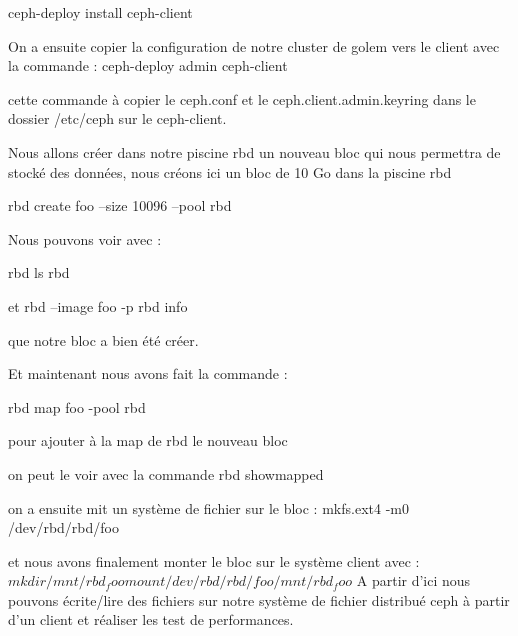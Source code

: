 \documentclass{article}
\begin{document}
ceph-deploy install ceph-client

On a ensuite copier la configuration de notre cluster de golem vers le client avec la commande : 
ceph-deploy admin ceph-client

cette commande à copier le ceph.conf et le ceph.client.admin.keyring dans le dossier /etc/ceph sur le ceph-client.

Nous allons créer dans notre piscine rbd un nouveau bloc qui nous permettra de stocké des données, nous créons ici un bloc de 10 Go dans la piscine rbd

rbd create foo --size 10096 --pool rbd

Nous pouvons voir avec : 

rbd ls rbd 

et 
rbd --image foo -p rbd info 

que notre bloc a bien été créer.

Et maintenant nous avons fait la commande :

rbd map foo -pool rbd

pour ajouter à la map de rbd le nouveau bloc

on peut le voir avec la commande rbd showmapped

on a ensuite mit un système de fichier sur le bloc :
mkfs.ext4 -m0 /dev/rbd/rbd/foo

et nous avons finalement monter le bloc sur le système client avec :
$mkdir /mnt/rbd_foo
mount /dev/rbd/rbd/foo /mnt/rbd_foo
$
A partir d'ici nous pouvons écrite/lire des fichiers sur notre système de fichier distribué ceph à partir d'un client et réaliser les test de performances.
\end{document}
